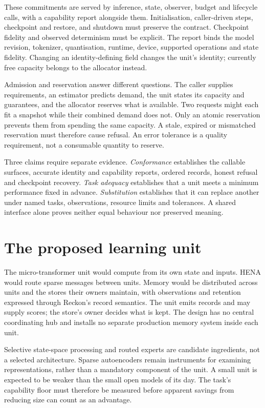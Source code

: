 These commitments are served by inference, state, observer, budget and lifecycle calls, with a capability report alongside them. Initialisation, caller-driven steps, checkpoint and restore, and shutdown must preserve the contract. Checkpoint fidelity and observed determinism must be explicit. The report binds the model revision, tokenizer, quantisation, runtime, device, supported operations and state fidelity. Changing an identity-defining field changes the unit's identity; currently free capacity belongs to the allocator instead.

Admission and reservation answer different questions. The caller supplies requirements, an estimator predicts demand, the unit states its capacity and guarantees, and the allocator reserves what is available. Two requests might each fit a snapshot while their combined demand does not. Only an atomic reservation prevents them from spending the same capacity. A stale, expired or mismatched reservation must therefore cause refusal. An error tolerance is a quality requirement, not a consumable quantity to reserve.

Three claims require separate evidence. \emph{Conformance} establishes the callable surfaces, accurate identity and capability reports, ordered records, honest refusal and checkpoint recovery. \emph{Task adequacy} establishes that a unit meets a minimum performance fixed in advance. \emph{Substitution} establishes that it can replace another under named tasks, observations, resource limits and tolerances. A shared interface alone proves neither equal behaviour nor preserved meaning.

\section{The proposed learning unit}

The micro-transformer unit would compute from its own state and inputs. HENA would route sparse messages between units. Memory would be distributed across units and the stores their owners maintain, with observations and retention expressed through Reckon's record semantics. The unit emits records and may supply scores; the store's owner decides what is kept. The design has no central coordinating hub and installs no separate production memory system inside each unit.

Selective state-space processing and routed experts are candidate ingredients, not a selected architecture. Sparse autoencoders remain instruments for examining representations, rather than a mandatory component of the unit. A small unit is expected to be weaker than the small open models of its day. The task's capability floor must therefore be measured before apparent savings from reducing size can count as an advantage.

